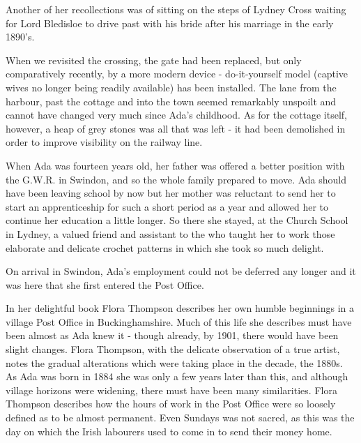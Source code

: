Another of her recollections was of sitting on the steps of Lydney Cross waiting for Lord Bledisloe to drive past with his bride after his marriage in the early 1890’s.

When we revisited the crossing, the gate had been replaced, but only comparatively recently, by a more modern device - do-it-yourself model (captive wives no longer being readily available) has been installed. The lane from the harbour, past the cottage and into the town seemed remarkably unspoilt and cannot have changed very much since Ada’s childhood. As for the cottage itself, however, a heap of grey stones was all that was left - it had been demolished in order to improve visibility on the railway line.

When Ada was fourteen years old, her father was offered a better position with the G.W.R. in Swindon, and so the whole family prepared to move. Ada should have been leaving school by now but her mother was reluctant to send her to start an apprenticeship for such a short period as a year and allowed her to continue her education a little longer. So there she stayed, at the Church School in Lydney, a valued friend and assistant to the  who taught her to work those elaborate and delicate crochet patterns in which she took so much delight.

On arrival in Swindon, Ada's employment could not be deferred any longer and it was here that she first entered the Post Office.

In her delightful book  Flora Thompson describes her own humble beginnings in a village Post Office in Buckinghamshire. Much of this life she describes must have been almost as Ada knew it - though already, by 1901, there would have been slight changes. Flora Thompson, with the delicate observation of a true artist, notes the gradual alterations which were taking place in the decade, the 1880s. As Ada was born in 1884 she was only a few years later than this, and although village horizons were widening, there must have been many similarities. Flora Thompson describes how the hours of work in the Post Office were so loosely defined as to be almost permanent. Even Sundays was not sacred, as this was the day on which the Irish labourers used to come in to send their money home.


